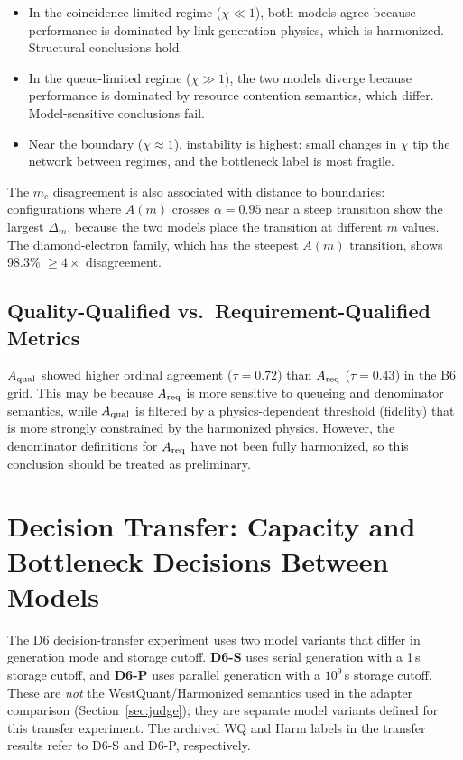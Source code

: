 \documentclass[aps,prapplied,reprint,superscriptaddress]{revtex4-2}
\newcommand{\Areq}{A_{\rm req}}
\newcommand{\Aqual}{A_{\rm qual}}
\begin{document}
\begin{itemize}[leftmargin=2em]
\item In the coincidence-limited regime ($\chi \ll 1$), both models agree because performance is dominated by link generation physics, which is harmonized. Structural conclusions hold.
\item In the queue-limited regime ($\chi \gg 1$), the two models diverge because performance is dominated by resource contention semantics, which differ. Model-sensitive conclusions fail.
\item Near the boundary ($\chi \approx 1$), instability is highest: small changes in $\chi$ tip the network between regimes, and the bottleneck label is most fragile.
\end{itemize}

The $m_c$ disagreement is also associated with distance to boundaries: configurations where $A(m)$ crosses $\alpha = 0.95$ near a steep transition show the largest $\Delta_m$, because the two models place the transition at different $m$ values. The diamond-electron family, which has the steepest $A(m)$ transition, shows 98.3\% $\geq 4\times$ disagreement.

\subsection{Quality-Qualified vs.\ Requirement-Qualified Metrics}

$\Aqual$ showed higher ordinal agreement ($\tau = 0.72$) than $\Areq$ ($\tau = 0.43$) in the B6 grid. This may be because $\Areq$ is more sensitive to queueing and denominator semantics, while $\Aqual$ is filtered by a physics-dependent threshold (fidelity) that is more strongly constrained by the harmonized physics. However, the denominator definitions for $\Areq$ have not been fully harmonized, so this conclusion should be treated as preliminary.

\section{Decision Transfer: Capacity and Bottleneck Decisions Between Models}
\label{sec:transfer}

The D6 decision-transfer experiment uses two model variants that differ in generation mode and storage cutoff. \textbf{D6-S} uses serial generation with a 1\,s storage cutoff, and \textbf{D6-P} uses parallel generation with a $10^9$\,s storage cutoff. These are \emph{not} the WestQuant/Harmonized semantics used in the adapter comparison (Section~\ref{sec:judge}); they are separate model variants defined for this transfer experiment. The archived WQ and Harm labels in the transfer results refer to D6-S and D6-P, respectively.
\end{document}
